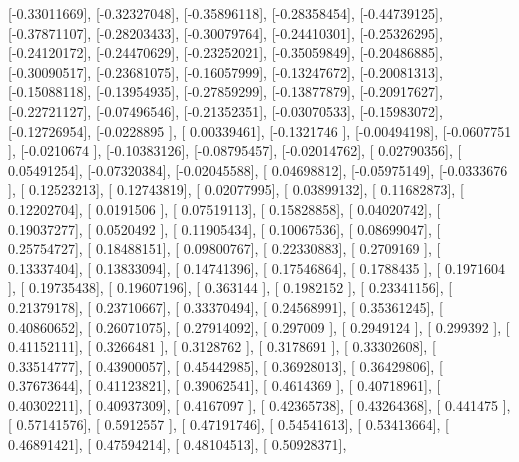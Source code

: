 \documentclass{article}
\begin{document}
       [-0.33011669],
       [-0.32327048],
       [-0.35896118],
       [-0.28358454],
       [-0.44739125],
       [-0.37871107],
       [-0.28203433],
       [-0.30079764],
       [-0.24410301],
       [-0.25326295],
       [-0.24120172],
       [-0.24470629],
       [-0.23252021],
       [-0.35059849],
       [-0.20486885],
       [-0.30090517],
       [-0.23681075],
       [-0.16057999],
       [-0.13247672],
       [-0.20081313],
       [-0.15088118],
       [-0.13954935],
       [-0.27859299],
       [-0.13877879],
       [-0.20917627],
       [-0.22721127],
       [-0.07496546],
       [-0.21352351],
       [-0.03070533],
       [-0.15983072],
       [-0.12726954],
       [-0.0228895 ],
       [ 0.00339461],
       [-0.1321746 ],
       [-0.00494198],
       [-0.0607751 ],
       [-0.0210674 ],
       [-0.10383126],
       [-0.08795457],
       [-0.02014762],
       [ 0.02790356],
       [ 0.05491254],
       [-0.07320384],
       [-0.02045588],
       [ 0.04698812],
       [-0.05975149],
       [-0.0333676 ],
       [ 0.12523213],
       [ 0.12743819],
       [ 0.02077995],
       [ 0.03899132],
       [ 0.11682873],
       [ 0.12202704],
       [ 0.0191506 ],
       [ 0.07519113],
       [ 0.15828858],
       [ 0.04020742],
       [ 0.19037277],
       [ 0.0520492 ],
       [ 0.11905434],
       [ 0.10067536],
       [ 0.08699047],
       [ 0.25754727],
       [ 0.18488151],
       [ 0.09800767],
       [ 0.22330883],
       [ 0.2709169 ],
       [ 0.13337404],
       [ 0.13833094],
       [ 0.14741396],
       [ 0.17546864],
       [ 0.1788435 ],
       [ 0.1971604 ],
       [ 0.19735438],
       [ 0.19607196],
       [ 0.363144  ],
       [ 0.1982152 ],
       [ 0.23341156],
       [ 0.21379178],
       [ 0.23710667],
       [ 0.33370494],
       [ 0.24568991],
       [ 0.35361245],
       [ 0.40860652],
       [ 0.26071075],
       [ 0.27914092],
       [ 0.297009  ],
       [ 0.2949124 ],
       [ 0.299392  ],
       [ 0.41152111],
       [ 0.3266481 ],
       [ 0.3128762 ],
       [ 0.3178691 ],
       [ 0.33302608],
       [ 0.33514777],
       [ 0.43900057],
       [ 0.45442985],
       [ 0.36928013],
       [ 0.36429806],
       [ 0.37673644],
       [ 0.41123821],
       [ 0.39062541],
       [ 0.4614369 ],
       [ 0.40718961],
       [ 0.40302211],
       [ 0.40937309],
       [ 0.4167097 ],
       [ 0.42365738],
       [ 0.43264368],
       [ 0.441475  ],
       [ 0.57141576],
       [ 0.5912557 ],
       [ 0.47191746],
       [ 0.54541613],
       [ 0.53413664],
       [ 0.46891421],
       [ 0.47594214],
       [ 0.48104513],
       [ 0.50928371],
\end{document}

